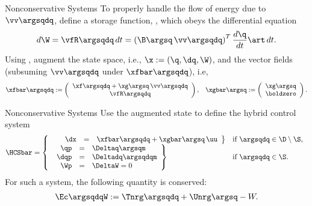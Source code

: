 \begin{frame}[t]
   {
    \begin{block}{Nonconservative Systems}
      To properly handle the flow of energy due to $\vv\argsqdq$, define a storage
      function, \W, which obeys the differential equation
      \begin{align*}
        d\W = \vfR\argsqdq \, dt = \left( \B\argsq \, \vv\argsqdq \right)^{T}
        \frac{d\q}{dt}\art \, dt.
      \end{align*}
      Using \W, augment the state space, i.e., $\x := (\q, \dq, \W)$, and the vector
      fields (subsuming $\vv\argsqdq$ under $\xfbar\argsqdq$), i.e, 
      \begin{align*}
        \xfbar\argsqdq := \left(\begin{array}{c}
            \xf\argsqdq + \xg\argsq \, \vv\argsqdq\\
            \vfR\argsqdq
          \end{array}\right), &&
        \xgbar\argsq := \left(\begin{array}{c}
            \xg\argsq\\
            \boldzero
          \end{array}\right).
      \end{align*}
    \end{block}
  }
   {
    \begin{block}{Nonconservative Systems}
      Use the augmented state to define the hybrid control system
      \begin{align*}
        \HCSbar = \left\{
          \begin{array}{l l}
            \left.\begin{array}{r c l}
                \hspace{1.15em}\dx &=& \xfbar\argsqdq + \xgbar\argsq \, \uu
              \end{array}\right\}  & \mbox{if } \argsqdq \in \D \setminus \S,\\
            \left. \begin{array}{r c l}
                \qp &=& \Deltaq\argsqm\\
                \dqp &=& \Deltadq\argsqdqm\\
                \Wp &=& \DeltaW = 0
              \end{array} \right\} & \mbox{if } \argsqdq \in \S.
          \end{array}\right.
      \end{align*}
      For such a system, the following quantity is conserved:
      \begin{align*}
        \Ec\argsqdqW := \Tnrg\argsqdq + \Unrg\argsq - W.
      \end{align*}
    \end{block}
  }
\end{frame}

